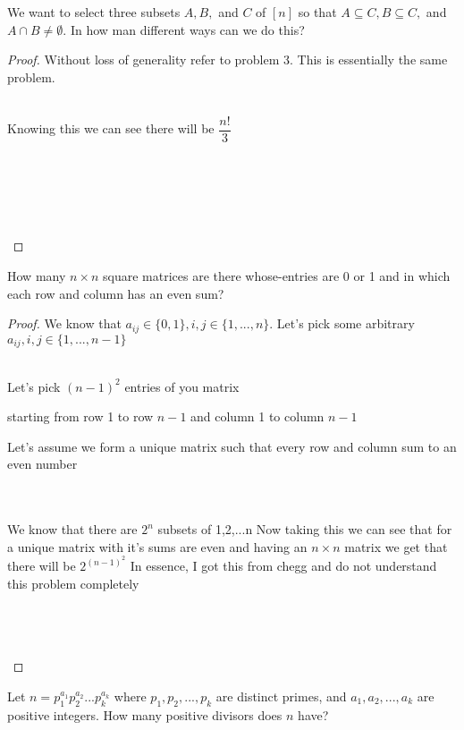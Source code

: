 \documentclass[12pt]{article}
\newenvironment{problem}[2][Problem]{\begin{trivlist}
\item[\hskip \labelsep {\bfseries #1}\hskip \labelsep {\bfseries #2.}]}{\end{trivlist}}
\begin{document}
\begin{problem}{6}
We want to select three subsets $A,B,$ and $C$ of $[n]$ so that $A \subseteq C, B \subseteq C,$ and $A \cap B \neq \emptyset$. In how man different ways can we do this?
\end{problem}

\begin{proof}
Without loss of generality refer to problem 3. This is essentially the same problem.  \\ \\
\centerline{Knowing this we can see there will be $\dfrac{n!}{3}$} \\ \\
\centerline{} \\ \\
\end{proof}

\begin{problem}{7}
How many $n \times n$ square matrices are there whose-entries are 0 or 1 and in which each row and column has an even sum?
\end{problem}

\begin{proof}
We know that $a_{ij} \in \{0,1 \}, i,j \in \{1,...,n\}$. Let's pick some arbitrary $a_{ij}, i,j \in \{ 1,..., n-1 \}$ \\ \\
\centerline{Let's pick $(n-1)^2$ entries of you matrix}
\centerline{starting from row 1 to row $n-1$ and column 1 to column $n-1$}
\centerline{Let's assume we form a unique matrix such that every row and column sum to an even number} \\ \\
We know that there are $2^n$ subsets of {1,2,...n} Now taking this we can see that for a unique matrix with it's sums are even and having an $n \times n$ matrix we get that there will be $2^{(n-1)^{2}}$ In essence, I got this from chegg and do not understand this problem completely\\ \\
\centerline{} \\ \\

\end{proof}

\begin{problem}{8}
Let $n = p_1^{a_1}p_2^{a_2}...p_k^{a_k}$ where $p_1,p_2,...,p_k$ are distinct primes, and $a_1,a_2,...,a_k$ are positive integers. How many positive divisors does $n$ have?
\end{problem}
 
\end{document}
